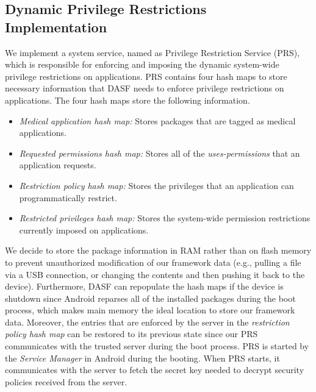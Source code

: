 \subsection{Dynamic Privilege Restrictions Implementation}

We implement a system service, named as Privilege Restriction
 Service (PRS), which is responsible for enforcing and imposing the
dynamic system-wide privilege restrictions on applications.  
PRS contains four hash maps to store necessary information that DASF
 needs to enforce privilege restrictions on applications.  The four
 hash maps store the following information.

\begin{itemize}
\item \textit{Medical application hash map:} Stores packages that are
 tagged as medical applications.
\item \textit{Requested permissions hash map:} Stores all of
the \textit{uses-permissions} that an application requests.
\item \textit{Restriction policy hash map:} Stores the privileges that
an application can programmatically restrict.
\item \textit{Restricted privileges hash map:} Stores the system-wide
permission restrictions currently imposed on applications.
\end{itemize}

We decide to store the package information in RAM rather than on flash
memory to prevent unauthorized modification of our framework data
(e.g., pulling a file via a USB connection, or changing the contents
and then pushing it back to the device). Furthermore, DASF can
repopulate the hash maps if the device is shutdown since Android
reparses all of the installed packages during the boot process, which
makes main memory the ideal location to store our framework data.
Moreover, the entries that are enforced by the server in
the \textit{restriction policy hash map} can be restored to its
previous state since our PRS communicates with the trusted server
during the boot process.  PRS is started by the \textit{Service
Manager} in Android during the booting.  When PRS starts, it
communicates with the server to fetch the secret key needed to decrypt
security policies received from the server.   

